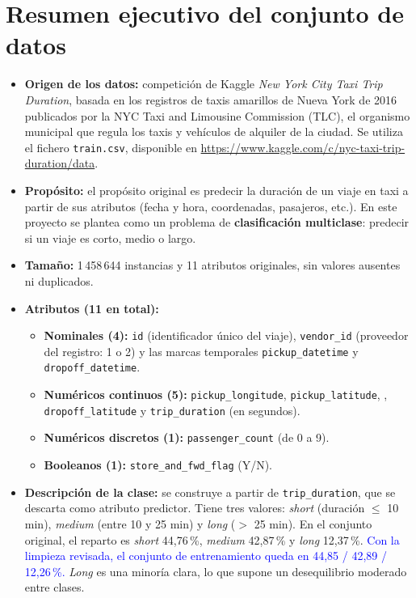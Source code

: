 \documentclass[12pt,a4paper]{article}
\newcommand{\cambio}[1]{\textcolor{blue}{#1}}
\begin{document}
\newpage
\section{Resumen ejecutivo del conjunto de datos}
\label{sec:resumen}

\begin{itemize}
    \item \textbf{Origen de los datos:} competición de Kaggle \textit{New York City Taxi Trip Duration}, basada en los registros de taxis amarillos de Nueva York de 2016 publicados por la NYC Taxi and Limousine Commission (TLC), el organismo municipal que regula los taxis y vehículos de alquiler de la ciudad. Se utiliza el fichero \texttt{train.csv}, disponible en \url{https://www.kaggle.com/c/nyc-taxi-trip-duration/data}.
    \item \textbf{Propósito:} el propósito original es predecir la duración de un viaje en taxi a partir de sus atributos (fecha y hora, coordenadas, pasajeros, etc.). En este proyecto se plantea como un problema de \textbf{clasificación multiclase}: predecir si un viaje es corto, medio o largo.
    \item \textbf{Tamaño:} 1\,458\,644 instancias y 11 atributos originales, sin valores ausentes ni duplicados.
    \item \textbf{Atributos (11 en total):}
    \begin{itemize}
        \item \textbf{Nominales (4):} \texttt{id} (identificador único del viaje), \texttt{vendor\_id} (proveedor del registro: 1 o 2) y las marcas temporales \texttt{pickup\_datetime} y \texttt{dropoff\_datetime}.
        \item \textbf{Numéricos continuos (5):} \texttt{pickup\_longitude}, \texttt{pickup\_latitude}, , \texttt{dropoff\_latitude} y \texttt{trip\_duration} (en segundos).
        \item \textbf{Numéricos discretos (1):} \texttt{passenger\_count} (de 0 a 9).
        \item \textbf{Booleanos (1):} \texttt{store\_and\_fwd\_flag} (Y/N).
    \end{itemize}
    \item \textbf{Descripción de la clase:} se construye a partir de \texttt{trip\_duration}, que se descarta como atributo predictor. Tiene tres valores: \textit{short} (duración $\leq$ 10 min), \textit{medium} (entre 10 y 25 min) y \textit{long} ($>$ 25 min). En el conjunto original, el reparto es \textit{short} 44,76\,\%, \textit{medium} 42,87\,\% y \textit{long} 12,37\,\%. \cambio{Con la limpieza revisada, el conjunto de entrenamiento queda en 44,85 / 42,89 / 12,26\,\%.} \textit{Long} es una minoría clara, lo que supone un desequilibrio moderado entre clases.
\end{itemize}
\end{document}
